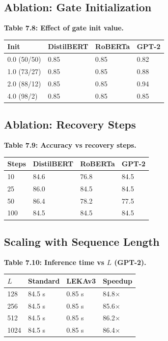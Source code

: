 \subsection{Ablation: Gate Initialization}

\textbf{Table 7.8: Effect of gate init value.}

\begin{table}[H]
\centering
\small
\begin{tabular}{llll}
\toprule
\textbf{Init} & \textbf{DistilBERT} & \textbf{RoBERTa} & \textbf{GPT-2} \\
\midrule
0.0 (50/50) & 0.85 & 0.85 & 0.82 \\
1.0 (73/27) & 0.85 & 0.85 & 0.88 \\
2.0 (88/12) & 0.85 & 0.85 & 0.94 \\
4.0 (98/2) & 0.85 & 0.85 & 0.85 \\
\bottomrule
\end{tabular}
\end{table}

\subsection{Ablation: Recovery Steps}

\textbf{Table 7.9: Accuracy vs recovery steps.}

\begin{table}[H]
\centering
\small
\begin{tabular}{llll}
\toprule
\textbf{Steps} & \textbf{DistilBERT} & \textbf{RoBERTa} & \textbf{GPT-2} \\
\midrule
10 & 84.6 & 76.8 & 84.5 \\
25 & 86.0 & 84.5 & 84.5 \\
50 & 86.4 & 78.2 & 77.5 \\
100 & 84.5 & 84.5 & 84.5 \\
\bottomrule
\end{tabular}
\end{table}

\subsection{Scaling with Sequence Length}

\textbf{Table 7.10: Inference time vs $L$ (GPT-2).}

\begin{table}[H]
\centering
\small
\begin{tabular}{llll}
\toprule
\textbf{$L$} & \textbf{Standard} & \textbf{LEKAv3} & \textbf{Speedup} \\
\midrule
128 & 84.5 s & 0.85 s & 84.8$\times$ \\
256 & 84.5 s & 0.85 s & 85.6$\times$ \\
512 & 84.5 s & 0.85 s & 86.2$\times$ \\
1024 & 84.5 s & 0.85 s & 86.4$\times$ \\
\bottomrule
\end{tabular}
\end{table}


